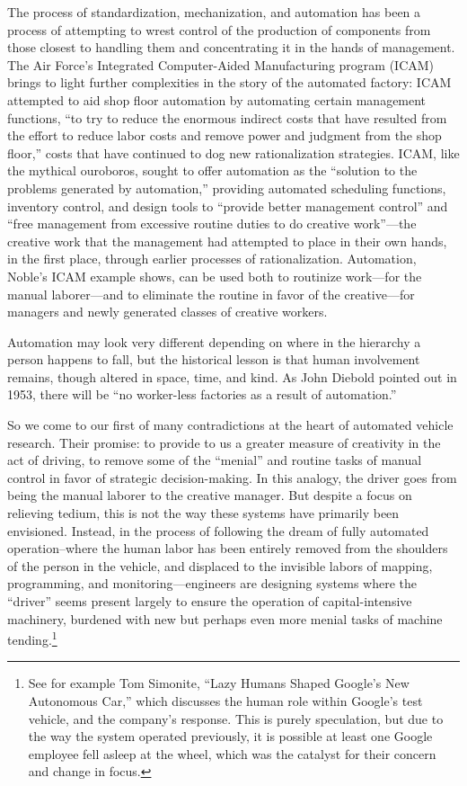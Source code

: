 The process of standardization,
mechanization, and automation has been a process of attempting to
wrest control of the production of components from those closest to
handling them and concentrating it in the hands of management. The Air Force's Integrated Computer-Aided Manufacturing program (ICAM)
brings to light further complexities in the story of the automated
factory: ICAM attempted to aid shop floor automation by automating certain
management functions, ``to try to reduce the enormous indirect costs
that have resulted from the effort to reduce labor costs and remove
power and judgment from the shop floor,'' costs that have continued to
dog new rationalization strategies.\cite[p. 330]{nobleForces} ICAM, like the mythical
ouroboros, sought to offer automation as the ``solution to the problems
generated by automation,'' providing automated scheduling functions,
inventory control, and design tools to ``provide better management
control'' and ``free management from excessive routine duties to do
creative work''---the creative work that the management had attempted to
place in their own hands, in the first place, through earlier
processes of rationalization.\cite[p. 330]{nobleForces}  Automation, Noble's ICAM example shows,
can be used both to routinize work---for the manual laborer---and to
eliminate the routine in favor of the creative---for managers and newly
generated classes of creative workers. 

Automation may look very different depending on where in the hierarchy
a person happens to fall, but the historical lesson is that human
involvement remains, though altered in space, time, and kind. As John
Diebold pointed out in 1953, there will be ``no worker-less
factories as a result of automation.''\cite[p. 63-64]{dieboldNew}

So we come to our first of many contradictions at the heart of
automated vehicle research. Their promise:
to provide to us a greater measure of creativity in the act of
driving, to remove some of the ``menial'' and routine tasks of manual
control in favor of strategic decision-making. In this analogy, the
driver goes from being the manual laborer to the creative manager. But
despite a focus on relieving tedium, this is not the way these systems
have primarily been envisioned. Instead, in the process of following
the dream of fully automated operation--where the human labor has been
entirely removed from the shoulders of the person in the vehicle, and
displaced to the invisible labors of mapping, programming, and
monitoring---engineers are designing systems where the ``driver''
seems present largely to ensure the operation of capital-intensive
machinery, burdened with new but perhaps even more menial tasks of
machine tending.\footnote{See for example Tom Simonite, ``Lazy Humans
Shaped Google's New Autonomous Car,''\cite{simonite}  which discusses
the human role within Google's test vehicle,
and the company's response. This is purely speculation, but due to
the way the system operated previously, it is possible at least one Google
employee fell asleep at the wheel, which was the catalyst for their
concern and change in focus.} 


